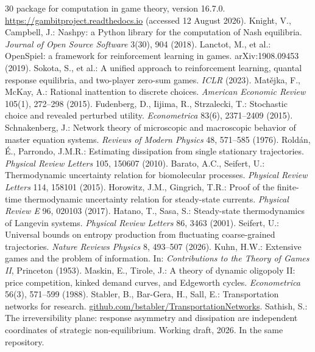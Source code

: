 \documentclass[11pt]{article}
\begin{document}
\begin{thebibliography}{30}
package for computation in game theory, version 16.7.0.
\url{https://gambitproject.readthedocs.io} (accessed 12 August 2026).
 Knight, V., Campbell, J.: Nashpy: a Python library
for the computation of Nash equilibria. \emph{Journal of Open Source Software}
3(30), 904 (2018).
 Lanctot, M., et al.: OpenSpiel: a
framework for reinforcement learning in games. arXiv:1908.09453 (2019).
 Sokota, S., et al.: A unified approach
to reinforcement learning, quantal response equilibria, and two-player zero-sum
games. \emph{ICLR} (2023).
 Mat\v{e}jka, F., McKay, A.:
Rational inattention to discrete choices. \emph{American Economic Review} 105(1),
272--298 (2015).
 Fudenberg, D., Iijima, R.,
Strzalecki, T.: Stochastic choice and revealed perturbed utility.
\emph{Econometrica} 83(6), 2371--2409 (2015).
 Schnakenberg, J.: Network theory of
microscopic and macroscopic behavior of master equation systems. \emph{Reviews of
Modern Physics} 48, 571--585 (1976).
 Rold\'an, \'E., Parrondo,
J.M.R.: Estimating dissipation from single stationary trajectories. \emph{Physical
Review Letters} 105, 150607 (2010).
 Barato, A.C., Seifert, U.:
Thermodynamic uncertainty relation for biomolecular processes. \emph{Physical
Review Letters} 114, 158101 (2015).
 Horowitz, J.M., Gingrich,
T.R.: Proof of the finite-time thermodynamic uncertainty relation for
steady-state currents. \emph{Physical Review E} 96, 020103 (2017).
 Hatano, T., Sasa, S.: Steady-state
thermodynamics of Langevin systems. \emph{Physical Review Letters} 86, 3463 (2001).
 Seifert, U.: Universal bounds on entropy
production from fluctuating coarse-grained trajectories. \emph{Nature Reviews
Physics} 8, 493--507 (2026).
 Kuhn, H.W.: Extensive games and the problem of
information. In: \emph{Contributions to the Theory of Games II}, Princeton (1953).
 Maskin, E., Tirole, J.: A theory of
dynamic oligopoly II: price competition, kinked demand curves, and Edgeworth
cycles. \emph{Econometrica} 56(3), 571--599 (1988).
 Stabler, B., Bar-Gera, H., Sall, E.:
Transportation networks for research. \url{github.com/bstabler/TransportationNetworks}.
 Sathish, S.: The irreversibility plane: response
asymmetry and dissipation are independent coordinates of strategic
non-equilibrium. Working draft, 2026. In the same repository.
\end{thebibliography}
\end{document}
